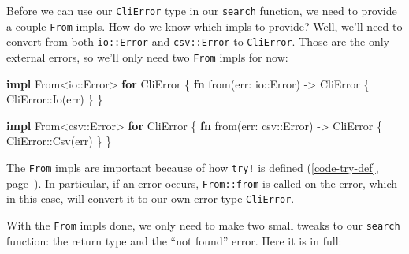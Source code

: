 \documentclass[a4paper,]{book}
\renewcommand*{\hyperref}[2][\ar]{%
  \def\ar{#2}%
  #2 (\autoref{#1}, page~\pageref{#1})}
\newenvironment{Shaded}{\begin{snugshade}}{\end{snugshade}}
\newcommand{\KeywordTok}[1]{\textcolor[rgb]{0.13,0.29,0.53}{\textbf{{#1}}}}
\newcommand{\NormalTok}[1]{{#1}}
\begin{document}
Before we can use our \texttt{CliError} type in our \texttt{search}
function, we need to provide a couple \texttt{From} impls. How do we
know which impls to provide? Well, we'll need to convert from both
\texttt{io::Error} and \texttt{csv::Error} to \texttt{CliError}. Those
are the only external errors, so we'll only need two \texttt{From} impls
for now:

\begin{Shaded}
\begin{Highlighting}[]
\KeywordTok{impl} \NormalTok{From<io::Error> }\KeywordTok{for} \NormalTok{CliError \{}
    \KeywordTok{fn} \NormalTok{from(err: io::Error) -> CliError \{}
        \NormalTok{CliError::Io(err)}
    \NormalTok{\}}
\NormalTok{\}}

\KeywordTok{impl} \NormalTok{From<csv::Error> }\KeywordTok{for} \NormalTok{CliError \{}
    \KeywordTok{fn} \NormalTok{from(err: csv::Error) -> CliError \{}
        \NormalTok{CliError::Csv(err)}
    \NormalTok{\}}
\NormalTok{\}}
\end{Highlighting}
\end{Shaded}

The \texttt{From} impls are important because of how
\hyperref[code-try-def]{\texttt{try!} is defined}. In particular, if an
error occurs, \texttt{From::from} is called on the error, which in this
case, will convert it to our own error type \texttt{CliError}.

With the \texttt{From} impls done, we only need to make two small tweaks
to our \texttt{search} function: the return type and the ``not found''
error. Here it is in full:
\end{document}
